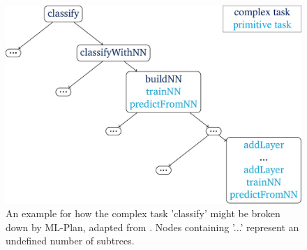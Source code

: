 \begin{figure}
\centering
\includegraphics[width=.8\textwidth]{gfx/MLPlan.pdf}
\caption{An example for how the complex task 'classify' might be broken down by ML-Plan, adapted from \cite{wever2017automatic}. Nodes containing '...' represent an undefined number of subtrees.}
\label{fig:mltree}
\end{figure}

